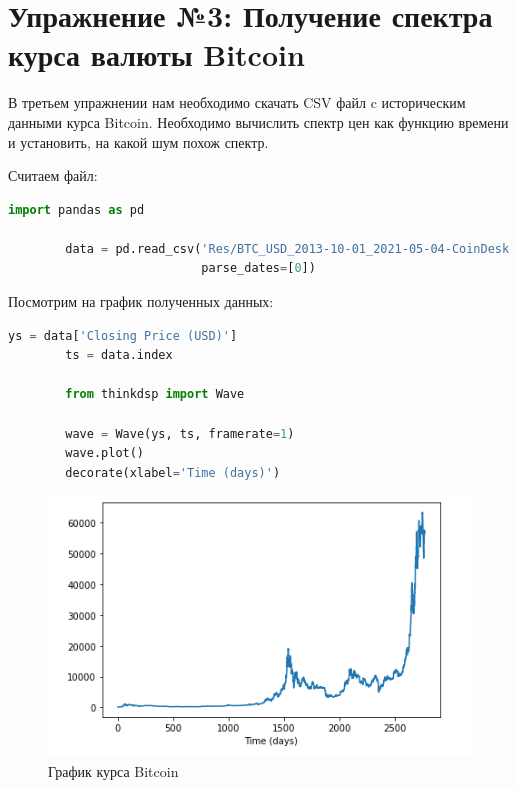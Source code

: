 \documentclass[a4paper, 14pt]{extarticle}
\begin{document}
    \newpage


    \section{Упражнение №3: Получение спектра курса валюты Bitcoin}
    \label{sec:3}

    В третьем упражнении нам необходимо скачать CSV файл c историческим данными курса Bitcoin.
    Необходимо вычислить спектр цен как функцию времени и установить, на какой шум похож спектр.

    Считаем файл:

    \begin{lstlisting}[language=Python, caption= Считывание файла, label={lst:read_bitcoin}]
        import pandas as pd

        data = pd.read_csv('Res/BTC_USD_2013-10-01_2021-05-04-CoinDesk.csv',
                           parse_dates=[0])
    \end{lstlisting}

    Посмотрим на график полученных данных:

    \begin{lstlisting}[language=Python, caption= Построение графика, label={lst:make_bitcoin_wave}]
        ys = data['Closing Price (USD)']
        ts = data.index

        from thinkdsp import Wave

        wave = Wave(ys, ts, framerate=1)
        wave.plot()
        decorate(xlabel='Time (days)')
    \end{lstlisting}

    \begin{figure}[H]
        \centering
        \includegraphics[width=0.8\linewidth]{bitcoin_wave}
        \caption{График курса Bitcoin}
        \label{fig:bitcoin_wave}
    \end{figure}
\end{document}
